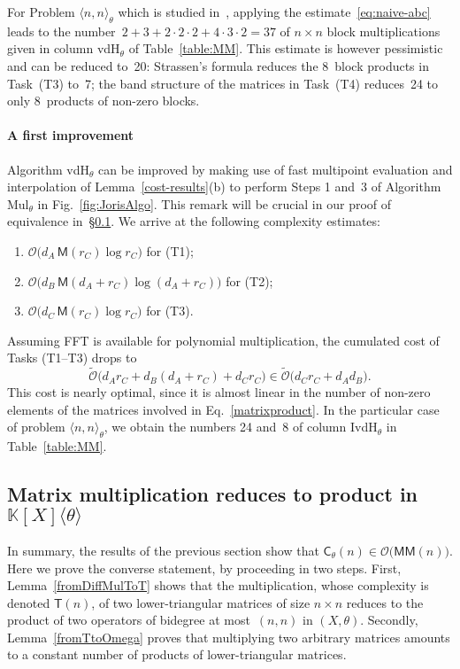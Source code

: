 \documentclass{sig-alt-full}
\newcommand{\x}{X}
\newcommand{\Tx}{\theta}
\newcommand{\bigO}{{\mathcal{O}}}
\newcommand{\bigOsoft}{\tilde{\mathcal{O}}}
\newcommand{\MM}{\mathsf{MM}}
\def\OMul#1#2#3{\langle #1,#2 \rangle_{#3}}
\newcommand{\sC}{\mathsf{C}}
\newcommand{\sM}{\mathsf{M}}
\newcommand{\sT}{\mathsf{T}}
\newcommand{\bK}{\mathbb{K}}
\begin{document}
For Problem $\OMul nn \Tx$ which is studied in~\cite{vdHoeven02}, applying the estimate~\eqref{eq:naive-abc} leads to the number~$2+3+2\cdot2\cdot2+4\cdot3\cdot2=37$ of $n \times n$ block multiplications given in column \textsf{vdH${}_\Tx$} of Table~\ref{table:MM}.
This estimate is however pessimistic and can be reduced to~20:
Strassen's formula reduces the 8~block products in Task~(T3) to~7;
the band structure of the matrices in Task~(T4) reduces~24 to only 8~products of non-zero blocks.



\paragraph*{A first improvement}
Algorithm \textsf{vdH${}_\Tx$} can be improved
by making use of fast multipoint evaluation and interpolation of Lemma~\ref{cost-results}(b) to perform Steps 1 and~3 of Algorithm {\textsf{Mul${}_\Tx$}} in Fig.~\ref{fig:JorisAlgo}.
This remark will be crucial in our proof of equivalence in~\S\ref{ssec:MatToOper}.
We arrive at the following complexity estimates:
\begin{enumerate}
\item $\bigO\bigl(d_A \, \sM(r_C) \log r_C \bigr)$ for (T1);
\item $\bigO\bigl(d_B \, \sM(d_A+r_C) \log (d_A+r_C) \bigr)$ for (T2);
\item $\bigO\bigl(d_C \, \sM(r_C) \log r_C \bigr)$ for (T3).
\end{enumerate}

Assuming FFT is available for polynomial multiplication, the cumulated  cost of Tasks (T1--T3) drops to
\[\bigOsoft\bigl(d_A r_C + d_B(d_A+r_C) + d_C r_C\bigr) \in  \bigOsoft\bigl( d_Cr_C + d_A d_B\bigr).\]
This cost is nearly optimal, since it is almost linear in the number of non-zero elements of the matrices involved in Eq.~\eqref{matrixproduct}.
In the particular case of problem $\OMul nn \Tx$, we obtain the numbers 24 and~8 of column \textsf{IvdH${}_\Tx$} in Table~\ref{table:MM}.



\subsection{Matrix multiplication reduces to  product in $ \bK[\x]\langle \Tx  \rangle$} \label{ssec:MatToOper}
In summary, the results of the previous section show that $\sC_\Tx(n)\in \bigO\bigl(\MM(n)\bigr)$.
Here we prove the converse statement, by proceeding in two steps.
First, Lemma~\ref{fromDiffMulToT} shows that the multiplication, whose complexity is denoted $\sT(n)$, of two lower-tri\-an\-gu\-lar matrices of size $n\times n$ reduces to the product of two operators of bidegree at most~$(n,n)$ in $(\x,\Tx)$.
Secondly, Lemma~\ref{fromTtoOmega} proves that multiplying two arbitrary matrices amounts to a constant number of products of lower-triangular matrices.
\end{document}
